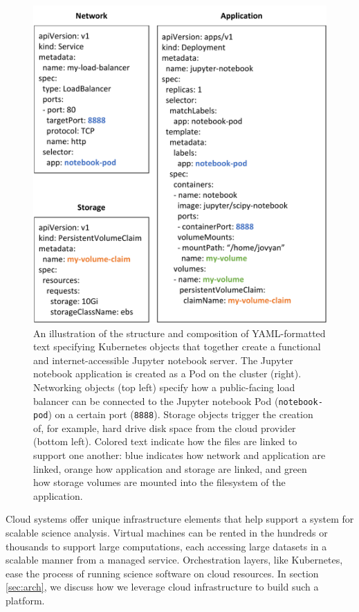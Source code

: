 \documentclass[twocolumn, linenumbers]{aastex631}
\begin{document}
\begin{figure}
    \centering
    \includegraphics[width=\linewidth]{k8s_objects.pdf}
    \caption{An illustration of the structure and composition of YAML-formatted text specifying Kubernetes objects that together create a functional and internet-accessible Jupyter notebook server. The Jupyter notebook application is created as a Pod on the cluster (right). Networking objects (top left) specify how a public-facing load balancer can be connected to the Jupyter notebook Pod (\texttt{notebook-pod}) on a certain port (\texttt{8888}). Storage objects trigger the creation of, for example, hard drive disk space from the cloud provider (bottom left). Colored text indicate how the files are linked to support one another: blue indicates how network and application are linked, orange how application and storage are linked, and green how storage volumes are mounted into the filesystem of the application.}
    \label{fig:k8s_objects}
\end{figure}

Cloud systems offer unique infrastructure elements that help support a system for scalable science analysis. Virtual machines can be rented in the hundreds or thousands to support large computations, each accessing large datasets in a scalable manner from a managed service. Orchestration layers, like Kubernetes, ease the process of running science software on cloud resources. In section \ref{sec:arch}, we discuss how we leverage cloud infrastructure to build such a platform.
\end{document}
